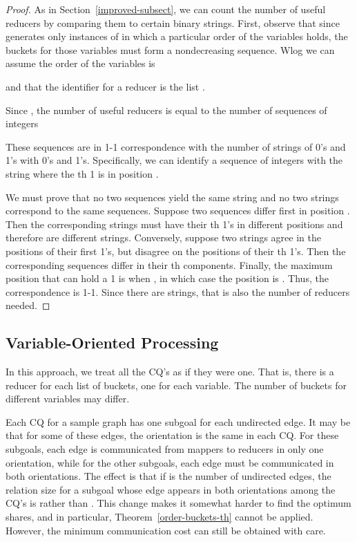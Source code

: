\begin{proof}
As in Section~\ref{improved-subsect}, we can count the number of useful reducers by comparing them to certain binary strings.  First, observe that since  generates only instances of  in which a particular order of the variables holds, the buckets for those variables must form a nondecreasing sequence.  Wlog we can assume the order of the variables is

and that the identifier for a reducer is the list
.

Since , the number of useful reducers is equal to the number of sequences of integers

These sequences are in 1-1 correspondence with the number of strings of 0's and 1's with  0's and  1's.  Specifically, we can identify a sequence of integers  with the string where the th 1 is in position .

We must prove that no two sequences yield the same string and no two strings correspond to the same sequences.  Suppose two sequences differ first in position .  Then the corresponding strings must have their th 1's in different positions and therefore are different strings.  Conversely, suppose two strings agree in the positions of their first  1's, but disagree on the positions of their th 1's.  Then the corresponding sequences differ in their th components.  Finally, the maximum position that can hold a 1 is when , in which case the position is .  Thus, the correspondence is 1-1.  Since there are  strings, that is also the number of reducers needed.
\end{proof}


\subsection{Variable-Oriented Processing}
\label{combine-cq-subsect}



In this approach, we treat all the CQ's as if they were one.  That is, there is a reducer for each list of buckets, one for each variable.  The number of buckets for different variables may differ.

Each CQ for a sample graph  has one subgoal for each undirected edge.  It may be that for some of these edges, the orientation is the same in each CQ.  For these subgoals, each edge is communicated from mappers to reducers in only one orientation, while for the other subgoals, each edge must be communicated in both orientations.  The effect is that if  is the number of undirected edges, the relation size for a subgoal whose edge appears in both orientations among the CQ's is  rather than .
This change makes it somewhat harder to find the optimum shares, and in particular, Theorem~\ref{order-buckets-th} cannot be applied.  However, the minimum communication cost can still be obtained with care.

